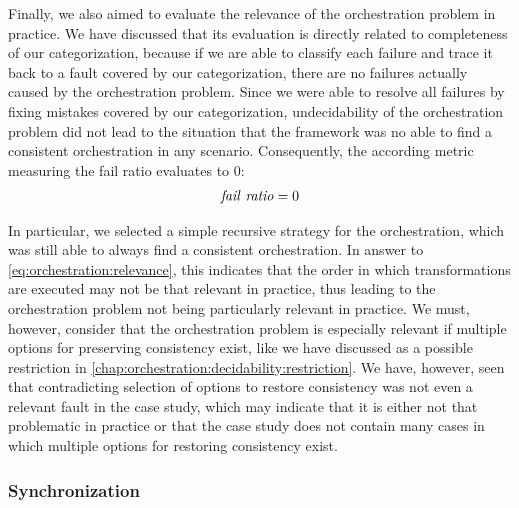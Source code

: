 Finally, we also aimed to evaluate the relevance of the orchestration problem in practice.
We have discussed that its evaluation is directly related to completeness of our categorization, because if we are able to classify each failure and trace it back to a fault covered by our categorization, there are no failures actually caused by the orchestration problem.
Since we were able to resolve all failures by fixing mistakes covered by our categorization, undecidability of the orchestration problem did not lead to the situation that the \vitruv framework was no able to find a consistent orchestration in any scenario.
Consequently, the according metric measuring the fail ratio evaluates to $0$:
\begin{align*}
    \mathit{fail\ ratio} = 0
\end{align*}

In particular, we selected a simple recursive strategy for the orchestration, which was still able to always find a consistent orchestration.
In answer to \autoref{eq:orchestration:relevance}, this indicates that the order in which transformations are executed may not be that relevant in practice, thus leading to the orchestration problem not being particularly relevant in practice.
We must, however, consider that the orchestration problem is especially relevant if multiple options for preserving consistency exist, like we have discussed as a possible restriction in \autoref{chap:orchestration:decidability:restriction}.
We have, however, seen that contradicting selection of options to restore consistency was not even a relevant fault in the case study, which may indicate that it is either not that problematic in practice or that the case study does not contain many cases in which multiple options for restoring consistency exist.


\subsubsection{Synchronization}

